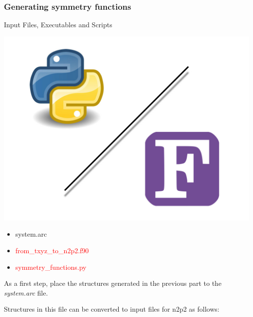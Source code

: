 \documentclass[12pt]{article}
\begin{document}
\subsubsection{Generating symmetry functions}
\begin{mybox2}{{Input Files, Executables and Scripts}}
\begin{minipage}[c]{0.5\linewidth}
\includegraphics[scale=0.1]{latex_files/Python-fortran.jpeg}
\end{minipage}
\begin{minipage}[c]{0.5\linewidth}
\begin{itemize}
    \item system.arc
    \item \textcolor{red}{from\_txyz\_to\_n2p2.f90}
    \item \textcolor{red}{symmetry\_functions.py}
\end{itemize}
\end{minipage}
\end{mybox2}

As a first step, place the structures generated in the previous part to the \textit{system.arc} file. 

Structures in this file can be converted to input files for n2p2 as follows:
\end{document}
